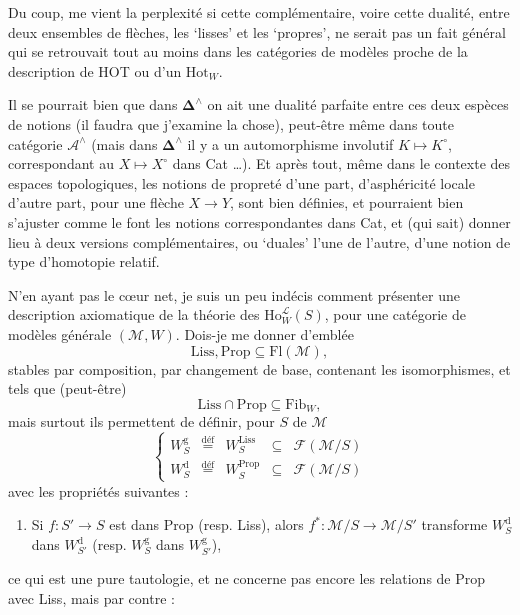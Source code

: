 \documentclass[11pt]{article}
\newcommand{\printedpage}[1]{\marginpar{\footnotesize p.~#1}}
\newcommand{\msp}[1]{\marginpar{\footnotesize [#1]}}
\newcommand{\circled}[1]{\tikz[baseline=(c.base)]\node[draw,circle,inner sep=1pt](c){#1};}
\newcommand{\deff}{\overset{\text{déf}}{=}}
\begin{document}
Du coup, me vient la perplexité si cette complémentaire, voire cette dualité, entre deux ensembles de flèches, les `lisses' et les `propres', ne serait pas un fait général qui se retrouvait tout au moins dans les catégories de modèles proche de la description de HOT ou d'un $\mathrm{Hot}_W$.

\msp{page 225}

Il se pourrait bien que dans $\boldsymbol{\Delta}^\wedge$ on ait une dualité parfaite entre ces deux espèces de notions (il faudra que j'examine la chose), peut-être même dans toute catégorie $\mathcal{A}^\wedge$ (mais dans $\boldsymbol{\Delta}^\wedge$ il y a un automorphisme involutif $K \longmapsto K^\circ$, correspondant au $X \longmapsto X^\circ$ dans Cat \dots). Et après tout, même dans le contexte des espaces topologiques, les notions de propreté d'une part, d'asphéricité locale d'autre part, pour une flèche $X \longrightarrow Y$, sont bien définies, et pourraient bien s'ajuster comme le font les notions correspondantes dans Cat, et (qui sait) donner lieu à deux versions complémentaires, ou `duales' l'une de l'autre, d'une notion de type d'homotopie relatif.

N'en ayant pas le cœur net, je suis un peu indécis comment présenter une description axiomatique de la théorie des $\mathrm{Ho}^{\mathcal{L}}_W(S)$, pour une catégorie de modèles générale $(\mathcal{M},W)$. Dois-je me donner d'emblée
\[
\mathrm{Liss}, \mathrm{Prop} \subseteq \mathrm{Fl}(\mathcal{M}),
\]
stables par composition, par changement de base, contenant les isomorphismes, et tels que (peut-être)
\[
\mathrm{Liss} \cap \mathrm{Prop} \subseteq \mathrm{Fib}_W,
\]
\msp{page 226}
mais surtout ils permettent de définir, pour $S$ de $\mathcal{M}$
\[
\left\{
\begin{array}{lcccl}
W^{\mathrm{g}}_S & \deff & W^{\mathrm{Liss}}_S & \subseteq & \mathcal{F}(\mathcal{M}/S)\\
W^{\mathrm{d}}_S & \deff & W^{\mathrm{Prop}}_S & \subseteq & \mathcal{F}(\mathcal{M}/S)
\end{array}
\right.
\]
avec les propriétés suivantes :

\begin{enumerate}
\item[{\circled{a}}] Si $f : S' \longrightarrow S$ est dans Prop (resp. Liss), alors $f^* : \mathcal{M}/S \longrightarrow \mathcal{M}/S'$ transforme $W^{\mathrm{d}}_S$ dans $W^{\mathrm{d}}_{S'}$ (resp. $W^{\mathrm{g}}_S$ dans $W^{\mathrm{g}}_{S'}$),
\end{enumerate}
\printedpage{144}
\noindent ce qui est une pure tautologie, et ne concerne pas encore les relations de Prop avec Liss, mais par contre :
\end{document}
